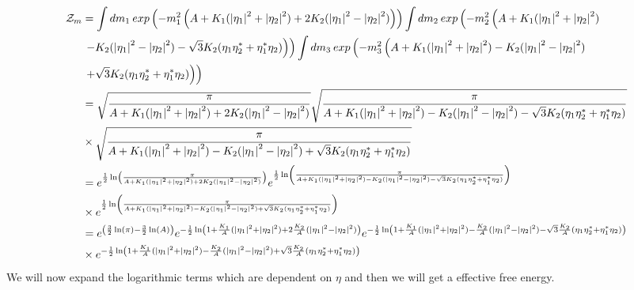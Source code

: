 \documentclass[prl,notitlepage,aps]{revtex4-1}
\begin{document}
\begin{align}\label{Zm}
\mathcal{Z}_m&=\int dm_1 \hspace{0.2em} exp\left(-m_1^2\left(A+K_1(\abs{\eta_1}^2+\abs{\eta_2}^2)+2K_2(\abs{\eta_1}^2-\abs{\eta_2}^2)\right)\right) \int dm_2 \hspace{0.2em} exp\left(-m_2^2\left(A+K_1(\abs{\eta_1}^2+\abs{\eta_2}^2)\nonumber\right.\right.\\
&\left.\left.- K_2(\abs{\eta_1}^2 -\abs{\eta_2}^2)-\sqrt{3}K_2(\eta_1\eta_2^*+\eta_1^*\eta_2)\right)\right)\int dm_3 \hspace{0.2em} exp\left(-m_3^2\left(A+K_1(\abs{\eta_1}^2+\abs{\eta_2}^2)- K_2(\abs{\eta_1}^2 -\abs{\eta_2}^2)\nonumber\right.\right.\\
&\left.\left.+\sqrt{3}K_2(\eta_1\eta_2^*+\eta_1^*\eta_2)\right)\right)\nonumber\\
&=\sqrt{\frac{\pi}{A+K_1(\abs{\eta_1}^2+\abs{\eta_2}^2)+2K_2(\abs{\eta_1}^2-\abs{\eta_2}^2)}} \sqrt{\frac{\pi}{A+K_1(\abs{\eta_1}^2+\abs{\eta_2}^2) - K_2(\abs{\eta_1}^2 -\abs{\eta_2}^2)-\sqrt{3}K_2(\eta_1\eta_2^*+\eta_1^*\eta_2)}}\nonumber\\
&\times \sqrt{\frac{\pi}{A+K_1(\abs{\eta_1}^2+\abs{\eta_2}^2) - K_2(\abs{\eta_1}^2 -\abs{\eta_2}^2)+\sqrt{3}K_2(\eta_1\eta_2^*+\eta_1^*\eta_2)}}\nonumber\\
&=e^{\frac{1}{2}\ln\left(\frac{\pi}{A+K_1(\abs{\eta_1}^2+\abs{\eta_2}^2)+2K_2(\abs{\eta_1}^2-\abs{\eta_2}^2)}\right)}e^{\frac{1}{2}\ln\left(\frac{\pi}{A+K_1(\abs{\eta_1}^2+\abs{\eta_2}^2) - K_2(\abs{\eta_1}^2 -\abs{\eta_2}^2)-\sqrt{3}K_2(\eta_1\eta_2^*+\eta_1^*\eta_2)}\right)}\nonumber\\
&\times e^{\frac{1}{2}\ln\left(\frac{\pi}{A+K_1(\abs{\eta_1}^2+\abs{\eta_2}^2) - K_2(\abs{\eta_1}^2 -\abs{\eta_2}^2)+\sqrt{3}K_2(\eta_1\eta_2^*+\eta_1^*\eta_2)}\right)}\nonumber\\
&=e^{\left(\frac{3}{2}\ln(\pi)-\frac{3}{2}\ln(A)\right)}e^{-\frac{1}{2}\ln\left(1+\frac{K_1}{A}(\abs{\eta_1}^2+\abs{\eta_2}^2)+2\frac{K_2}{A}(\abs{\eta_1}^2-\abs{\eta_2}^2)\right)} e^{-\frac{1}{2}\ln\left(1+\frac{K_1}{A}(\abs{\eta_1}^2+\abs{\eta_2}^2) -\frac{K_2}{A}(\abs{\eta_1}^2 -\abs{\eta_2}^2)-\sqrt{3}\frac{K_2}{A}(\eta_1\eta_2^*+\eta_1^*\eta_2)\right)}\nonumber\\
&\times e^{-\frac{1}{2}\ln\left(1+\frac{K_1}{A}(\abs{\eta_1}^2+\abs{\eta_2}^2) -\frac{K_2}{A}(\abs{\eta_1}^2 -\abs{\eta_2}^2)+\sqrt{3}\frac{K_2}{A}(\eta_1\eta_2^*+\eta_1^*\eta_2)\right)}
\end{align}
We will now expand the logarithmic terms which are dependent on $\eta$ and then we will get a effective free energy. 
\end{document}
